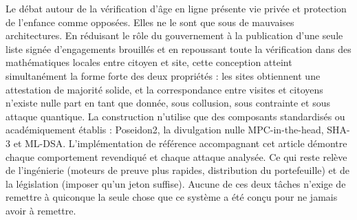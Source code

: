 \documentclass[11pt]{article}
\theoremstyle{definition}
\begin{document}
Le débat autour de la vérification d'âge en ligne présente vie privée et protection de
l'enfance comme opposées. Elles ne le sont que sous de mauvaises architectures. En
réduisant le rôle du gouvernement à la publication d'une seule liste signée d'engagements
brouillés et en repoussant toute la vérification dans des mathématiques locales entre
citoyen et site, cette conception atteint simultanément la forme forte des deux propriétés
: les sites obtiennent une attestation de majorité solide, et la correspondance entre
visites et citoyens n'existe nulle part en tant que donnée, sous collusion, sous
contrainte et sous attaque quantique. La construction n'utilise que des composants
standardisés ou académiquement établis : Poseidon2, la divulgation nulle MPC-in-the-head,
SHA-3 et ML-DSA. L'implémentation de référence accompagnant cet article démontre chaque
comportement revendiqué et chaque attaque analysée. Ce qui reste relève de l'ingénierie
(moteurs de preuve plus rapides, distribution du portefeuille) et de la législation
(imposer qu'un jeton suffise). Aucune de ces deux tâches n'exige de remettre à quiconque
la seule chose que ce système a été conçu pour ne jamais avoir à remettre.



\end{document}
